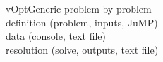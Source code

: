 \documentclass[10pt,xcolor=dvipsnames]{beamer}
\begin{document}
%
% 
\begin{frame}

\begin{center}
{\Large
 \textcolor[RGB]{52,57,176}{
   vOptGeneric problem by problem\\
   \vspace{5mm}
   {\small
   definition (problem, inputs, JuMP) \\
   data (console, text file) \\
   resolution (solve, outputs, text file) \\
   }
 }
} 
\end{center}
\end{frame}

%
% 
\end{document}
